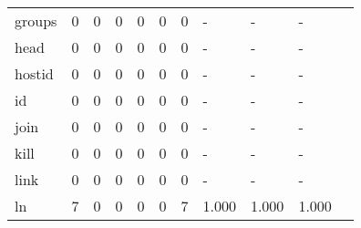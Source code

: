 \begin{longtable}{lp{1.10cm}p{1.10cm}p{1.10cm}p{1.10cm}p{1.10cm}p{1.10cm}p{1.10cm}p{1.10cm}p{1.10cm}p{1.10cm}}
groups    &                      0 &                                  0 &                                 0 &                                0 &                                 0 &                               0 &                              - &                                     - &                                   - \\
head      &                      0 &                                  0 &                                 0 &                                0 &                                 0 &                               0 &                              - &                                     - &                                   - \\
hostid    &                      0 &                                  0 &                                 0 &                                0 &                                 0 &                               0 &                              - &                                     - &                                   - \\
id        &                      0 &                                  0 &                                 0 &                                0 &                                 0 &                               0 &                              - &                                     - &                                   - \\
join      &                      0 &                                  0 &                                 0 &                                0 &                                 0 &                               0 &                              - &                                     - &                                   - \\
kill      &                      0 &                                  0 &                                 0 &                                0 &                                 0 &                               0 &                              - &                                     - &                                   - \\
link      &                      0 &                                  0 &                                 0 &                                0 &                                 0 &                               0 &                              - &                                     - &                                   - \\
ln        &                      7 &                                  0 &                                 0 &                                0 &                                 0 &                               7 &                          1.000 &                                 1.000 &                               1.000 \\

\end{longtable}
